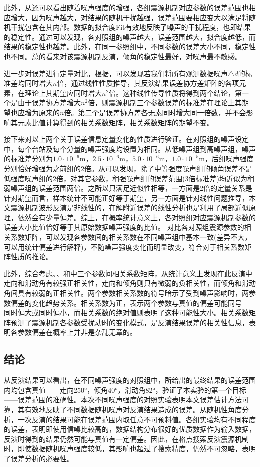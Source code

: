 此外，从还可以看出随着噪声强度的增强，各组震源机制对应参数的误差范围也相应增大，因为噪声越大，对结果的随机干扰越强，误差范围要相应变大以满足将随机干扰包含在其内部。数据的拟合度Fit有效地反映了噪声的干扰程度，也即结果的稳定性。通过可以发现，各对照组的噪声越大，误差范围越大，拟合度越低，而结果的稳定性也越差。此外，在同一参照组中，不同参数的误差大小不同，稳定性也不同。总的看来对该震源机制反演，倾角的稳定性最好，对噪声最不敏感。

进一步对误差进行定量对比，根据，可以发现若我们将所有观测数据噪声${\triangle}d$的标准差均同时增大$n$倍，通过线性性质推导，其反演结果误差协方差矩阵的各项元素，在理论上其期望应同时增大$n^2$倍。这种线性传导性质将得到两个结论，第一个是由于误差协方差增大$n^2$倍，则震源机制三个参数误差的标准差在理论上其期望也应增为原来的$n$倍。第二个是误差协方差各无素同时增大同一倍数，并不会影响其元素比值计算得到的相关系数矩阵，相关系数矩阵的期望不变。

接下来对以上两个关于误差信息定量变化的性质进行验证。在对照组的噪声设定中，每个台站及每个分量的噪声强度均设置为相同。从低噪声组到高噪声组，噪声的标准差分别为$1.0\cdot10^{-6}$m，$2.5\cdot10^{-6}$m，$5.0\cdot10^{-6}$m，$1.0\cdot10^{-5}$m，后组噪声强度分别恰好增强为之前组的2倍。从可以发现，除了中等强度噪声组的倾角误差不是低强度噪声组的2倍，对其它参数，稍强噪声组的误差范围(3倍标准差)均近似为稍弱噪声组的误差范围两倍。之所以只满足近似性相等，一方面是2倍的定量关系是针对期望而言，样本统计不可能正好等于期望，另一方面是针对线性问题推导，本文震源机制波形反演是非线性的，在解附近误差的线性分析也是利用了局部近似原理，依然会有少量偏差。综上，在概率统计意义上，各对照组对应震源机制参数的误差大小比值恰好等于其原始数据噪声强度的比值。
对比各对照组震源参数的相关系数矩阵，可以发现各参数间的相关系数在不同噪声组中基本一致(差异不大，可以用统计偏差进行解释)，不随噪声强度变化而明显改变，符合对于相关系数矩阵性质的推论。

此外，综合考虑、、和中三个参数间相关系数矩阵，从统计意义上发现在此反演中走向和滑动角有较强正相关性，走向和倾角则只有微弱的负相关性，而倾角和滑动角间具有较弱的正相关性。两个参数相关系数的符号暗示了受到噪声影响时，两参数偏差的变化趋势关系。相关系数为正，表示两个参数与真值的偏差可能同号——同时偏大或同时偏小，而相关系数的绝对值则表明了这种可能性大小。相关系数矩阵预测了震源机制各参数受扰动时的变化模式，是反演结果误差的相关性信息，表明各参数偏差在概率上并非是杂乱无章的。

\subsection{结论}
从反演结果可以看出，在不同噪声强度的对照组中，所给出的最终结果的误差范围内均包含真值——走向250°，倾角40°，滑动角82°，验证了本实验的第一个目标——误差范围的准确性。本次不同噪声强度的对照实验表明本文误差估计方法可靠，其有效地反映了不同数据随机噪声对反演结果造成的误差。从随机性角度分析，一次反演的结果可能在误差范围内取任意不可预料值。各组实验均有不同程度的误差，表明即使用信噪比较高的，数据结构分布很好的优质数据作为输入数据，反演时得到的结果仍然可能与真值有一定偏差。因此，在格点搜索反演震源机制时，即使数据随机噪声强度较低，其影响也超过了搜索精度，仍然不可忽略，表明了误差分析的必要性。

